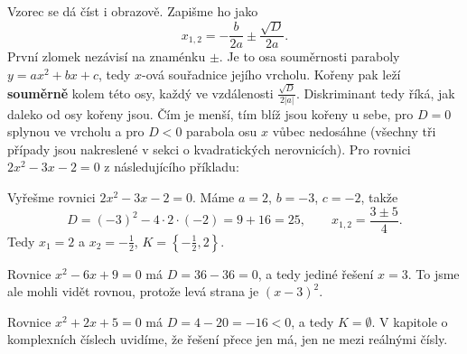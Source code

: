 Vzorec se dá číst i obrazově. Zapišme ho jako
\begin{equation*}
  x_{1,2} = -\frac{b}{2a}\pm\frac{\sqrt{D}}{2a}.
\end{equation*}
První zlomek nezávisí na znaménku $\pm$. Je to osa souměrnosti paraboly $y = ax^2 + bx + c$, tedy $x$-ová souřadnice jejího vrcholu. Kořeny pak leží \textbf{souměrně} kolem této osy, každý ve vzdálenosti $\frac{\sqrt{D}}{2|a|}$. Diskriminant tedy říká, jak daleko od osy kořeny jsou. Čím je menší, tím blíž jsou kořeny u sebe, pro $D = 0$ splynou ve vrcholu a pro $D < 0$ parabola osu $x$ vůbec nedosáhne (všechny tři případy jsou nakreslené v sekci o kvadratických nerovnicích). Pro rovnici $2x^2 - 3x - 2 = 0$ z následujícího příkladu:
\begin{center}
\end{center}

\begin{example}\label{ex:kvadr-vzorec}
  Vyřešme rovnici $2x^2 - 3x - 2 = 0$. Máme $a = 2$, $b = -3$, $c = -2$, takže
  \begin{equation*}
    D = {(-3)}^2 - 4\cdot 2\cdot(-2) = 9 + 16 = 25,\qquad x_{1,2} = \frac{3\pm 5}{4}.
  \end{equation*}
  Tedy $x_1 = 2$ a $x_2 = -\frac{1}{2}$, $K = \left\{-\frac{1}{2}, 2\right\}$.

  Rovnice $x^2 - 6x + 9 = 0$ má $D = 36 - 36 = 0$, a tedy jediné řešení $x = 3$. To jsme ale mohli vidět rovnou, protože levá strana je ${(x - 3)}^2$.

  Rovnice $x^2 + 2x + 5 = 0$ má $D = 4 - 20 = -16 < 0$, a tedy $K = \emptyset$. V kapitole o komplexních číslech uvidíme, že řešení přece jen má, jen ne mezi reálnými čísly.
\end{example}

